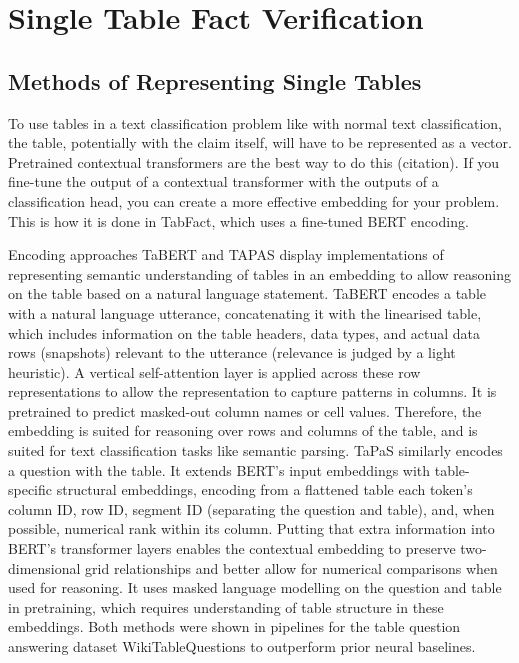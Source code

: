 \section{Single Table Fact Verification}

\subsection{Methods of Representing Single Tables}
To use tables in a text classification problem like with normal text classification, the table, potentially with the claim itself, will have to be represented as a vector. Pretrained contextual transformers are the best way to do this (citation). If you fine-tune the output of a contextual transformer with the outputs of a classification head, you can create a more effective embedding for your problem. This is how it is done in TabFact, which uses a fine-tuned BERT encoding. 

\vspace{\baselineskip}
\noindent Encoding approaches TaBERT \parencite{yin2020tabert} and TAPAS \parencite{herzig2020tapas} display implementations of representing semantic understanding of tables in an embedding to allow reasoning on the table based on a natural language statement. TaBERT encodes a table with a natural language utterance, concatenating it with the linearised table, which includes information on the table headers, data types, and actual data rows (snapshots) relevant to the utterance (relevance is judged by a light heuristic). A vertical self-attention layer is applied across these row representations to allow the representation to capture patterns in columns. It is pretrained to predict masked-out column names or cell values. Therefore, the embedding is suited for reasoning over rows and columns of the table, and is suited for text classification tasks like semantic parsing. TaPaS similarly encodes a question with the table. It extends BERT’s \parencite{devlin2019bert} input embeddings with table-specific structural embeddings, encoding from a flattened table each token’s column ID, row ID, segment ID (separating the question and table), and, when possible, numerical rank within its column. Putting that extra information into BERT’s transformer layers enables the contextual embedding to preserve two-dimensional grid relationships and better allow for numerical comparisons when used for reasoning. It uses masked language modelling on the question and table in pretraining, which requires understanding of table structure in these embeddings. Both methods were shown in pipelines for the table question answering dataset WikiTableQuestions \parencite{pasupat2015compositional} to outperform prior neural baselines. 


